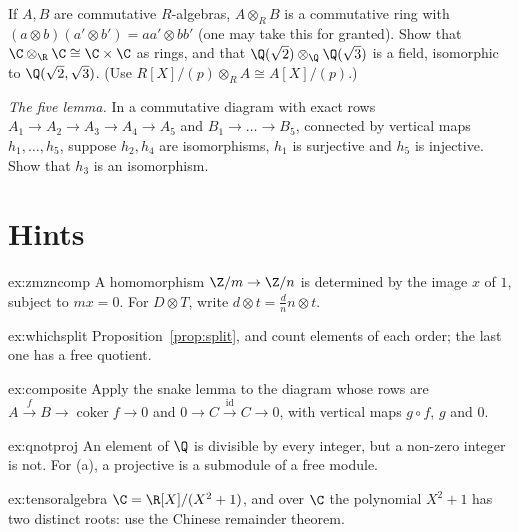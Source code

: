 \begin{exercise}[$\star\star$]\label{ex:tensoralgebra}
If $A,B$ are commutative $R$-algebras, $A\otimes_RB$ is a commutative ring with $(a\otimes b)(a'\otimes b')=aa'\otimes bb'$ (one may take this for granted). Show that $\C\otimes_{\R}\C\cong\C\times\C$ as rings, and that
$\Q(\sqrt2)\otimes_{\Q}\Q(\sqrt3)$ is a field, isomorphic to $\Q(\sqrt2,\sqrt3)$. (Use $R[X]/(p)\otimes_RA\cong A[X]/(p)$.)
\end{exercise}

\begin{exercise}[$\star\star$]\label{ex:fivelemma}
\emph{The five lemma.} In a commutative diagram with exact rows $A_1\to A_2\to A_3\to A_4\to A_5$ and $B_1\to\dots\to B_5$, connected by vertical maps $h_1,\dots,h_5$, suppose $h_2,h_4$ are isomorphisms, $h_1$ is surjective and $h_5$ is
injective. Show that $h_3$ is an isomorphism.
\end{exercise}

\section{Hints}

\begin{hint}{ex:zmzncomp}
A homomorphism $\Z/m\to\Z/n$ is determined by the image $x$ of $1$, subject to $mx=0$. For $D\otimes T$, write $d\otimes t=\frac dn n\otimes t$.
\end{hint}

\begin{hint}{ex:whichsplit}
Proposition~\ref{prop:split}, and count elements of each order; the last one has a free quotient.
\end{hint}

\begin{hint}{ex:composite}
Apply the snake lemma to the diagram whose rows are $A\xrightarrow fB\to\operatorname{coker}f\to0$ and $0\to C\xrightarrow{\mathrm{id}}C\to0$, with vertical maps $g\circ f$, $g$ and $0$.
\end{hint}

\begin{hint}{ex:qnotproj}
An element of $\Q$ is divisible by every integer, but a non-zero integer is not. For (a), a projective is a submodule of a free module.
\end{hint}

\begin{hint}{ex:tensoralgebra}
$\C=\R[X]/(X^2+1)$, and over $\C$ the polynomial $X^2+1$ has two distinct roots: use the Chinese remainder theorem.
\end{hint}

